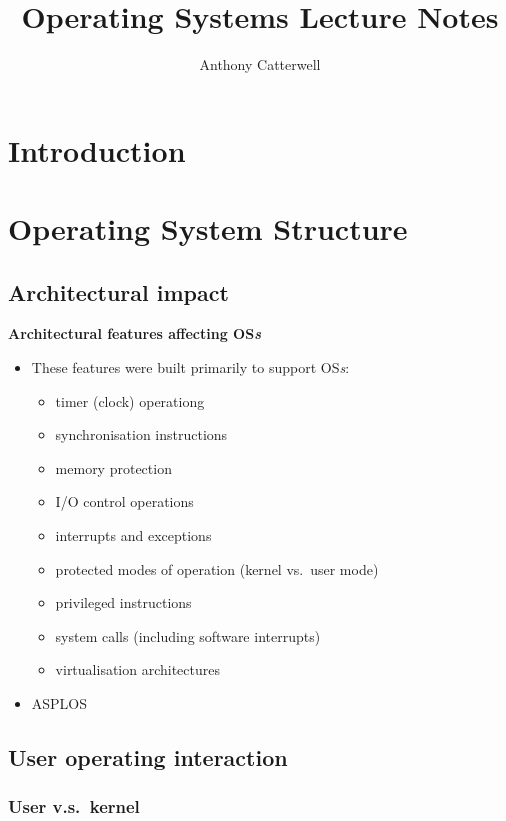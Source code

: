 \documentclass[11pt,a4paper]{article}
\title{Operating Systems Lecture Notes}
\author{Anthony Catterwell}
\begin{document}
\maketitle
\tableofcontents

\break{}

\section{Introduction}

\section{Operating System Structure}

\subsection{Architectural impact}

\textbf{Architectural features affecting OS\emph{s}}
\begin{itemize}
    \item These features were built primarily to support OS\emph{s}:
        \begin{itemize}
            \item timer (clock) operationg
            \item synchronisation instructions
            \item memory protection
            \item I/O control operations
            \item interrupts and exceptions
            \item protected modes of operation (kernel vs.\ user mode)
            \item privileged instructions
            \item system calls (including software interrupts)
            \item virtualisation architectures
        \end{itemize}
    \item ASPLOS
\end{itemize}

\subsection{User operating interaction}

\subsubsection{User v.s.\ kernel}
\end{document}
